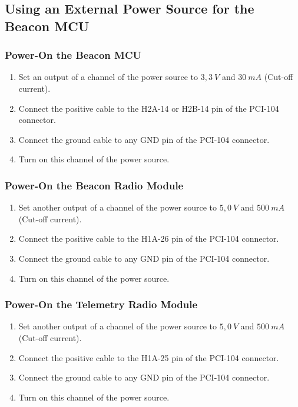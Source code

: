 \subsection{Using an External Power Source for the Beacon MCU}

\subsubsection{Power-On the Beacon MCU}

\begin{enumerate}
    \item Set an output of a channel of the power source to $3,3\ V$ and $30\ mA$ (Cut-off current).
    \item Connect the positive cable to the H2A-14 or H2B-14 pin of the PCI-104 connector.
    \item Connect the ground cable to any GND pin of the PCI-104 connector.
    \item Turn on this channel of the power source.
\end{enumerate}

\subsubsection{Power-On the Beacon Radio Module}

\begin{enumerate}
    \item Set another output of a channel of the power source to $5,0\ V$ and $500\ mA$ (Cut-off current).
    \item Connect the positive cable to the H1A-26 pin of the PCI-104 connector.
    \item Connect the ground cable to any GND pin of the PCI-104 connector.
    \item Turn on this channel of the power source.
\end{enumerate}

\subsubsection{Power-On the Telemetry Radio Module}

\begin{enumerate}
    \item Set another output of a channel of the power source to $5,0\ V$ and $500\ mA$ (Cut-off current).
    \item Connect the positive cable to the H1A-25 pin of the PCI-104 connector.
    \item Connect the ground cable to any GND pin of the PCI-104 connector.
    \item Turn on this channel of the power source.
\end{enumerate}

